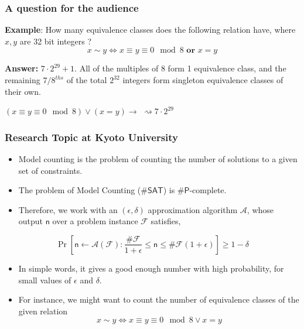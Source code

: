 \documentclass[
	11pt, %
]{beamer}
\begin{document}
\begin{frame}
	\frametitle{A question for the audience}
	\textbf{Example}: How many equivalence classes does the following relation have, where $x,y$ are 32 bit integers ? 
	\begin{equation}
		x \sim y \Leftrightarrow x \equiv y \equiv 0 \mod 8 \textbf{ or } x = y
	\end{equation}
	\pause
	\begin{center}
		\textbf{Answer:} $7\cdot2^{29} + 1$. All of the multiples of 8 form 1 equivalence class, and the remaining $7/8^{ths}$ of the total $2^{32}$ integers form singleton equivalence classes of their own.
	\end{center}
	\pause
	\begin{center}
		$(x \equiv y \equiv 0 \mod 8) \vee (x = y) \rightarrow$   $\rightsquigarrow 7\cdot2^{29}$
	\end{center}


\end{frame}
\begin{frame}
	\frametitle{Research Topic at Kyoto University}
	\begin{itemize}
		\item Model counting is the problem of counting the number of solutions to a given set of constraints.
		\item The problem of Model Counting (\#$\mathsf{SAT}$) is \#$\mathsf{P}$-complete.
		\item Therefore, we work with an $(\epsilon,\delta)$ approximation algorithm $\mathcal{A}$, whose output $\mathsf{n}$ over a problem instance $\mathcal{F}$ satisfies,

	\end{itemize}
	\[
		\Pr[\mathsf{n} \leftarrow \mathcal{A}(\mathcal{F}) :  \frac{\#\mathcal{F}}{1 + \epsilon} \leq \mathsf{n} \leq \#\mathcal{F}(1 + \epsilon)  ]	 \geq  1 - \delta
	\]
	\begin{itemize}
		\item  In simple words, it gives a good enough number with high probability, for small values of $\epsilon$ and $\delta$.
		\item For instance, we might want to count the number of equivalence classes of the given relation
		\begin{equation}
			x \sim y \Leftrightarrow x \equiv y \equiv 0 \mod 8 \vee x = y
		\end{equation}
	\end{itemize}
\end{frame}
\end{document}
